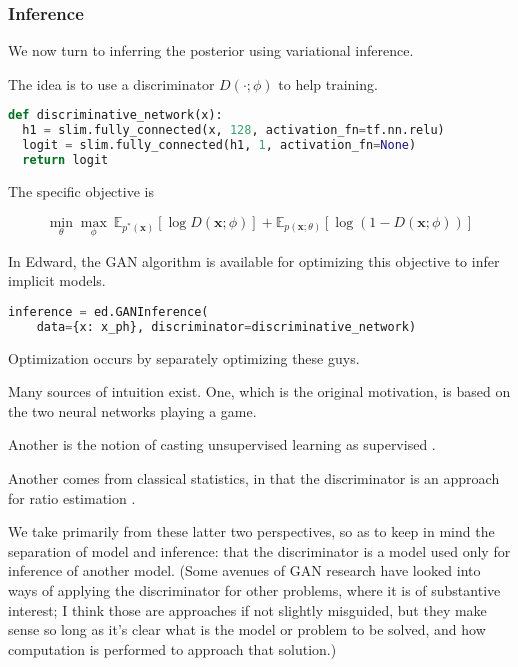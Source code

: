 \subsubsection{Inference}

We now turn to inferring the posterior using variational inference.

The idea is to use a discriminator $D(\cdot;\phi)$ to help training.

\begin{lstlisting}[language=Python]
def discriminative_network(x):
  h1 = slim.fully_connected(x, 128, activation_fn=tf.nn.relu)
  logit = slim.fully_connected(h1, 1, activation_fn=None)
  return logit
\end{lstlisting}

The specific objective is

\begin{equation*}
\min_\theta \max_\phi~
\mathbb{E}_{p^*(\mathbf{x})} [ \log D(\mathbf{x}; \phi) ]
+ \mathbb{E}_{p(\mathbf{x}; \theta)} [ \log (1 - D(\mathbf{x}; \phi)) ]
\end{equation*}

In Edward, the GAN algorithm is available for optimizing this
objective to infer implicit models.

\begin{lstlisting}[language=Python]
inference = ed.GANInference(
    data={x: x_ph}, discriminator=discriminative_network)
\end{lstlisting}

Optimization occurs by separately optimizing these guys.

Many sources of intuition exist. One, which is the original
motivation, is based on the two neural networks playing a game.

Another is the notion of casting unsupervised learning as supervised
\citep{gutmann2010noise,gutmann2014statistical}.

Another comes from classical statistics, in that the discriminator is
an approach for ratio estimation
\citep{sugiyama2012density,mohamed2016learning}.

We take primarily from these latter two perspectives, so as to keep in
mind the separation of model and inference: that the discriminator is
a model used only for inference of another model. (Some avenues of GAN
research have looked into ways of applying the discriminator for other
problems, where it is of substantive interest; I think those are
approaches if not slightly misguided, but they make sense so long as
it's clear what is the model or problem to be solved, and how
computation is performed to approach that solution.)

